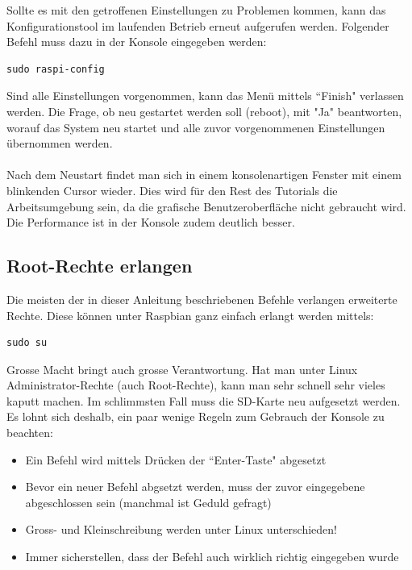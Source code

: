 Sollte es mit den getroffenen Einstellungen zu Problemen kommen, kann das Konfigurationstool im laufenden Betrieb erneut aufgerufen werden. Folgender Befehl muss dazu in der Konsole eingegeben werden:

\begin{lstlisting}
sudo raspi-config
\end{lstlisting}

Sind alle Einstellungen vorgenommen, kann das Menü mittels ``Finish" verlassen werden. Die Frage, ob neu gestartet werden soll (reboot), mit "Ja" beantworten, worauf das System neu startet und alle zuvor vorgenommenen Einstellungen übernommen werden.
\\
\\
Nach dem Neustart findet man sich in einem konsolenartigen Fenster mit einem blinkenden Cursor wieder. Dies wird für den Rest des Tutorials die Arbeitsumgebung sein, da die grafische Benutzeroberfläche nicht gebraucht wird. Die Performance ist in der Konsole zudem deutlich besser.

\subsection{Root-Rechte erlangen}
Die meisten der in dieser Anleitung beschriebenen Befehle verlangen erweiterte Rechte. Diese können unter Raspbian ganz einfach erlangt werden mittels:

\begin{lstlisting}
sudo su
\end{lstlisting}

Grosse Macht bringt auch grosse Verantwortung. Hat man unter Linux Administrator-Rechte (auch Root-Rechte), kann man sehr schnell sehr vieles kaputt machen. Im schlimmsten Fall muss die SD-Karte neu aufgesetzt werden. Es lohnt sich deshalb, ein paar wenige Regeln zum Gebrauch der Konsole zu beachten:

\begin{itemize}
\item Ein Befehl wird mittels Drücken der ``Enter-Taste" abgesetzt
\item Bevor ein neuer Befehl abgsetzt werden, muss der zuvor eingegebene abgeschlossen sein (manchmal ist Geduld gefragt)
\item Gross- und Kleinschreibung werden unter Linux unterschieden!
\item Immer sicherstellen, dass der Befehl auch wirklich richtig eingegeben wurde
\end{itemize}

